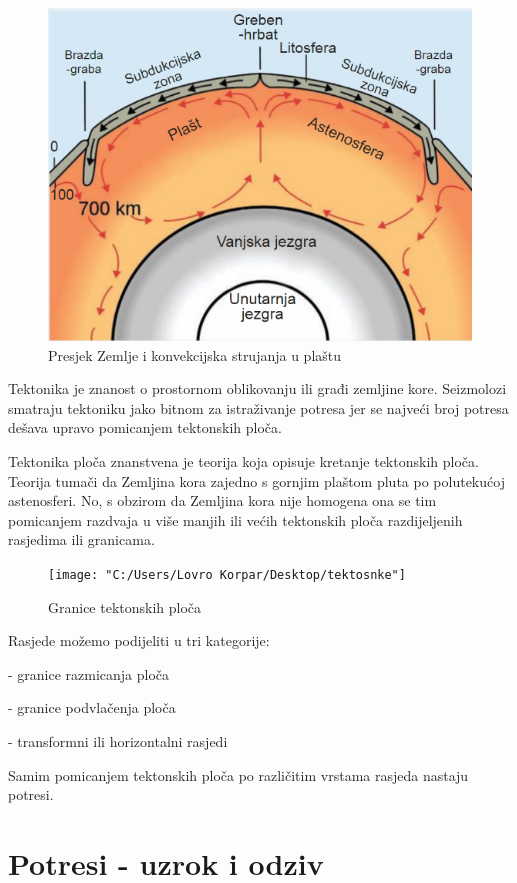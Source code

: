 \documentclass[12pt]{book}
\begin{document}
\begin{figure}[H]
	\centering
	\includegraphics[width=0.8\linewidth]{"Slike/presjek zemlje"}
	\caption{Presjek Zemlje i konvekcijska strujanja u plaštu \cite{oluic2015}}
	\label{fig:presjek-zemlje}
\end{figure}

Tektonika je znanost o prostornom oblikovanju ili građi zemljine kore. Seizmolozi smatraju tektoniku jako bitnom za istraživanje potresa jer se najveći broj potresa dešava upravo pomicanjem tektonskih ploča.


Tektonika ploča znanstvena je teorija koja opisuje kretanje tektonskih ploča. Teorija tumači da Zemljina kora zajedno s gornjim plaštom pluta po polutekućoj astenosferi. No, s obzirom da Zemljina kora nije homogena ona se tim pomicanjem razdvaja u više manjih ili većih tektonskih ploča razdijeljenih rasjedima ili granicama. \cite{oluic2015}

\begin{figure}[H]
	\centering
	\texttt{[image: "C:/Users/Lovro Korpar/Desktop/tektosnke"]}
	\caption{Granice tektonskih ploča \cite{tektonske}}
	\label{fig:tektosnke}
\end{figure}


Rasjede možemo podijeliti u tri kategorije:

- granice razmicanja ploča

- granice podvlačenja ploča

- transformni ili horizontalni rasjedi

Samim pomicanjem tektonskih ploča po različitim vrstama rasjeda nastaju potresi. \cite{oluic2015}

\section{Potresi - uzrok i odziv}
\end{document}
